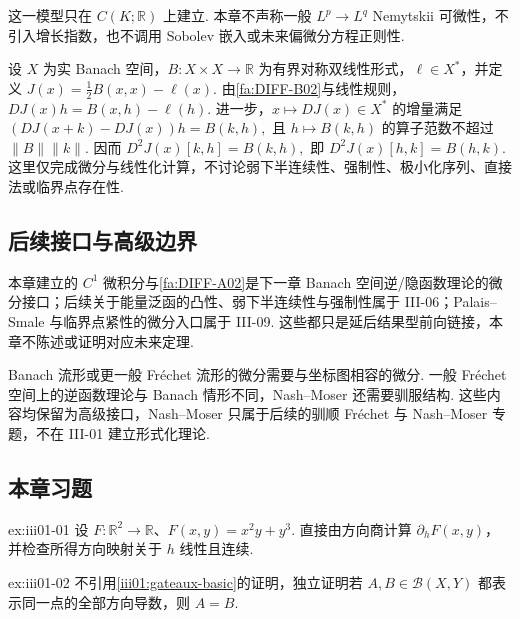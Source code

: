 这一模型只在 \(\displaystyle C(K;\mathbb R)\) 上建立. 本章不声称一般 \(\displaystyle L^p\to L^q\) Nemytskii 可微性，不引入增长指数，也不调用 Sobolev 嵌入或未来偏微分方程正则性.

\begin{FAApplication}[能量泛函线性化]\label{iii01:energy-linearization}
设 \(\displaystyle X\) 为实 Banach 空间，\(\displaystyle B:X\times X\to\mathbb R\) 为有界对称双线性形式，\(\displaystyle\ell\in X^*\)，并定义
\(\displaystyle J(x) = \frac{1}{2}B(x,x)-\ell(x).\)
由\autoref{fa:DIFF-B02}与线性规则，
\(\displaystyle DJ(x)h = B(x,h)-\ell(h).\)
进一步，\(\displaystyle x\mapsto DJ(x)\in X^*\) 的增量满足
\(\displaystyle (DJ(x+k)-DJ(x))h = B(k,h),\)
且 \(\displaystyle h\mapsto B(k,h)\) 的算子范数不超过 \(\displaystyle\|B\|\|k\|\). 因而
\(\displaystyle D^2J(x)[k,h] = B(k,h),\)
即 \(\displaystyle D^2J(x)[h,k]=B(h,k)\). 这里仅完成微分与线性化计算，不讨论弱下半连续性、强制性、极小化序列、直接法或临界点存在性.
\end{FAApplication}

\subsection{后续接口与高级边界}
本章建立的 \(\displaystyle C^1\) 微积分与\autoref{fa:DIFF-A02}是下一章 Banach 空间逆/隐函数理论的微分接口；后续关于能量泛函的凸性、弱下半连续性与强制性属于 III-06；Palais--Smale 与临界点紧性的微分入口属于 III-09. 这些都只是延后结果型前向链接，本章不陈述或证明对应未来定理.

Banach 流形或更一般 Fréchet 流形的微分需要与坐标图相容的微分. 一般 Fréchet 空间上的逆函数理论与 Banach 情形不同，Nash--Moser 还需要驯服结构. 这些内容均保留为高级接口，Nash--Moser 只属于后续的驯顺 Fréchet 与 Nash--Moser 专题，不在 III-01 建立形式化理论.

\subsection*{本章习题}\label{sec:iii01-exercises}

\begin{FAExercise}[方向导数]{ex:iii01-01}
设 \(\displaystyle F:\mathbb R^2\to\mathbb R\)、\(\displaystyle F(x,y)=x^2y+y^3\). 直接由方向商计算 \(\displaystyle\partial_hF(x,y)\)，并检查所得方向映射关于 \(\displaystyle h\) 线性且连续.
\end{FAExercise}

\begin{FAExercise}{ex:iii01-02}
不引用\autoref{iii01:gateaux-basic}的证明，独立证明若 \(\displaystyle A,B\in\mathcal B(X,Y)\) 都表示同一点的全部方向导数，则 \(\displaystyle A=B\).
\end{FAExercise}

